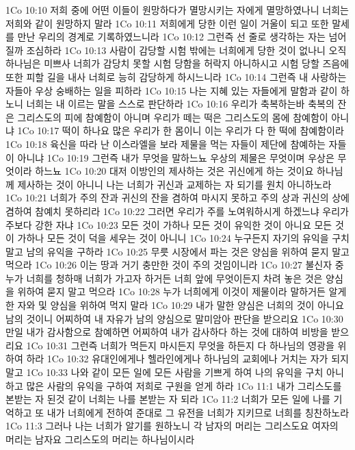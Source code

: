 1Co 10:10  저희 중에 어떤 이들이 원망하다가 멸망시키는 자에게 멸망하였나니 너희는 저희와 같이 원망하지 말라
1Co 10:11  저희에게 당한 이런 일이 거울이 되고 또한 말세를 만난 우리의 경계로 기록하였느니라
1Co 10:12  그런즉 선 줄로 생각하는 자는 넘어질까 조심하라
1Co 10:13  사람이 감당할 시험 밖에는 너희에게 당한 것이 없나니 오직 하나님은 미쁘사 너희가 감당치 못할 시험 당함을 허락지 아니하시고 시험 당할 즈음에 또한 피할 길을 내사 너희로 능히 감당하게 하시느니라
1Co 10:14  그런즉 내 사랑하는 자들아 우상 숭배하는 일을 피하라
1Co 10:15  나는 지혜 있는 자들에게 말함과 같이 하노니 너희는 내 이르는 말을 스스로 판단하라
1Co 10:16  우리가 축복하는바 축복의 잔은 그리스도의 피에 참예함이 아니며 우리가 떼는 떡은 그리스도의 몸에 참예함이 아니냐
1Co 10:17  떡이 하나요 많은 우리가 한 몸이니 이는 우리가 다 한 떡에 참예함이라
1Co 10:18  육신을 따라 난 이스라엘을 보라 제물을 먹는 자들이 제단에 참예하는 자들이 아니냐
1Co 10:19  그런즉 내가 무엇을 말하느뇨 우상의 제물은 무엇이며 우상은 무엇이라 하느뇨
1Co 10:20  대저 이방인의 제사하는 것은 귀신에게 하는 것이요 하나님께 제사하는 것이 아니니 나는 너희가 귀신과 교제하는 자 되기를 원치 아니하노라
1Co 10:21  너희가 주의 잔과 귀신의 잔을 겸하여 마시지 못하고 주의 상과 귀신의 상에 겸하여 참예치 못하리라
1Co 10:22  그러면 우리가 주를 노여워하시게 하겠느냐 우리가 주보다 강한 자냐
1Co 10:23  모든 것이 가하나 모든 것이 유익한 것이 아니요 모든 것이 가하나 모든 것이 덕을 세우는 것이 아니니
1Co 10:24  누구든지 자기의 유익을 구치 말고 남의 유익을 구하라
1Co 10:25  무릇 시장에서 파는 것은 양심을 위하여 묻지 말고 먹으라
1Co 10:26  이는 땅과 거기 충만한 것이 주의 것임이니라
1Co 10:27  불신자 중 누가 너희를 청하매 너희가 가고자 하거든 너희 앞에 무엇이든지 차려 놓은 것은 양심을 위하여 묻지 말고 먹으라
1Co 10:28  누가 너희에게 이것이 제물이라 말하거든 알게 한 자와 및 양심을 위하여 먹지 말라
1Co 10:29  내가 말한 양심은 너희의 것이 아니요 남의 것이니 어찌하여 내 자유가 남의 양심으로 말미암아 판단을 받으리요
1Co 10:30  만일 내가 감사함으로 참예하면 어찌하여 내가 감사하다 하는 것에 대하여 비방을 받으리요
1Co 10:31  그런즉 너희가 먹든지 마시든지 무엇을 하든지 다 하나님의 영광을 위하여 하라
1Co 10:32  유대인에게나 헬라인에게나 하나님의 교회에나 거치는 자가 되지 말고
1Co 10:33  나와 같이 모든 일에 모든 사람을 기쁘게 하여 나의 유익을 구치 아니하고 많은 사람의 유익을 구하여 저희로 구원을 얻게 하라
1Co 11:1  내가 그리스도를 본받는 자 된것 같이 너희는 나를 본받는 자 되라
1Co 11:2  너희가 모든 일에 나를 기억하고 또 내가 너희에게 전하여 준대로 그 유전을 너희가 지키므로 너희를 칭찬하노라
1Co 11:3  그러나 나는 너희가 알기를 원하노니 각 남자의 머리는 그리스도요 여자의 머리는 남자요 그리스도의 머리는 하나님이시라

